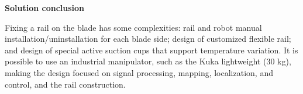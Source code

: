 



\textbf{Solution conclusion}

Fixing a rail on the blade has some complexities: rail and robot manual
installation/uninstallation for each blade side; design of customized flexible
rail; and design of special active suction cups that support temperature
variation. It is possible to use an industrial manipulator, such as the
Kuka lightweight (30 kg), making the design focused on signal processing,
mapping, localization, and control, and the rail construction. 

